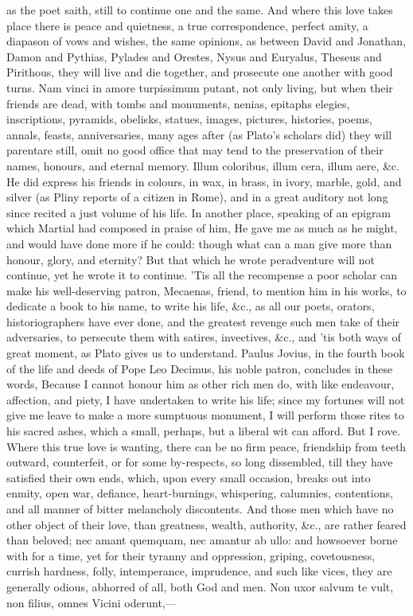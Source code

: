 {as the poet saith, still to continue one and the same. And where this
love takes place there is peace and quietness, a true correspondence,
perfect amity, a diapason of vows and wishes, the same opinions, as
between  David and Jonathan, Damon and Pythias, Pylades and
Orestes, Nysus and Euryalus, Theseus and Pirithous, they
will live and die together, and prosecute one another with good turns.
Nam vinci in amore turpissimum putant, not only living, but when
their friends are dead, with tombs and monuments, nenias, epitaphs
elegies, inscriptions, pyramids, obelisks, statues, images, pictures,
histories, poems, annals, feasts, anniversaries, many ages after (as
Plato's scholars did) they will parentare still, omit no good office
that may tend to the preservation of their names, honours, and eternal
memory. Illum coloribus, illum cera, illum aere, \&c. He did
express his friends in colours, in wax, in brass, in ivory, marble,
gold, and silver (as Pliny reports of a citizen in Rome), and in a
great auditory not long since recited a just volume of his life. In
another place, speaking of an epigram which Martial had composed
in praise of him, He gave me as much as he might, and would have
done more if he could: though what can a man give more than honour,
glory, and eternity? But that which he wrote peradventure will not
continue, yet he wrote it to continue. 'Tis all the recompense a poor
scholar can make his well-deserving patron, Mecaenas, friend, to
mention him in his works, to dedicate a book to his name, to write his
life, \&c., as all our poets, orators, historiographers have ever done,
and the greatest revenge such men take of their adversaries, to
persecute them with satires, invectives, \&c., and 'tis both ways of
great moment, as  Plato gives us to understand. Paulus Jovius, in
the fourth book of the life and deeds of Pope Leo Decimus, his noble
patron, concludes in these words, Because I cannot honour him as
other rich men do, with like endeavour, affection, and piety, I have
undertaken to write his life; since my fortunes will not give me leave
to make a more sumptuous monument, I will perform those rites to his
sacred ashes, which a small, perhaps, but a liberal wit can afford. But
I rove. Where this true love is wanting, there can be no firm peace,
friendship from teeth outward, counterfeit, or for some by-respects, so
long dissembled, till they have satisfied their own ends, which, upon
every small occasion, breaks out into enmity, open war, defiance,
heart-burnings, whispering, calumnies, contentions, and all manner of
bitter melancholy discontents. And those men which have no other object
of their love, than greatness, wealth, authority, \&c., are rather
feared than beloved; nec amant quemquam, nec amantur ab ullo: and
howsoever borne with for a time, yet for their tyranny and oppression,
griping, covetousness, currish hardness, folly, intemperance,
imprudence, and such like vices, they are generally odious, abhorred of
all, both God and men.
Non uxor salvum te vult, non filius, omnes
Vicini oderunt,---

}
